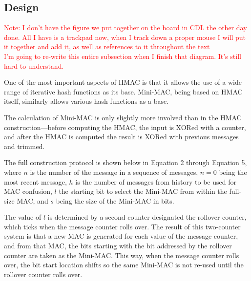 	
\subsection{Design}

\textcolor{red}{Note: I don't have the figure we put together on the board in CDL the other day done. All I have is a trackpad now, when I track down a proper mouse I will put it together and add it, as well as references to it throughout the text\\ I'm going to re-write this entire subsection when I finish that diagram. It's still hard to understand.}

One of the most important aspects of HMAC is that it allows the use of a wide range of iterative hash functions as its base. Mini-MAC, being based on HMAC itself, similarly allows various hash functions as a base.

The calculation of Mini-MAC is only slightly more involved than in the HMAC construction---before computing the HMAC, the input is XORed with a counter, and after the HMAC is computed the result is XORed with previous messages and trimmed.

The full construction protocol is shown below in Equation 2 through Equation 5, where $n$ is the number of the message in a sequence of messages, $n=0$ being the most recent message, $h$ is the number of messages from history to be used for MAC confusion, $l$ the starting bit to select the Mini-MAC from within the full-size MAC, and $s$ being the size of the Mini-MAC in bits. 

The value of $l$ is determined by a second counter designated the rollover counter, which ticks when the message counter rolls over. The result of this two-counter system is that a new MAC is generated for each value of the message counter, and from that MAC, the bits starting with the bit addressed by the rollover counter are taken as the Mini-MAC. This way, when the message counter rolls over, the bit start location shifts so the same Mini-MAC is not re-used until the rollover counter rolls over.

